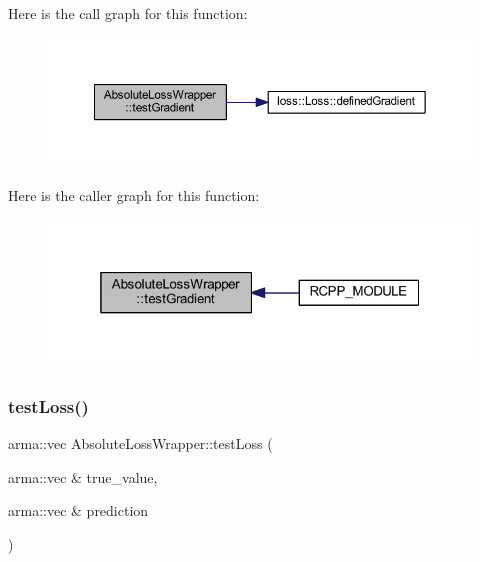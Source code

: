 Here is the call graph for this function\+:\nopagebreak
\begin{figure}[H]
\begin{center}
\leavevmode
\includegraphics[width=350pt]{class_absolute_loss_wrapper_af64fe7b1882afacfc7cc408a79884861_cgraph}
\end{center}
\end{figure}
Here is the caller graph for this function\+:\nopagebreak
\begin{figure}[H]
\begin{center}
\leavevmode
\includegraphics[width=319pt]{class_absolute_loss_wrapper_af64fe7b1882afacfc7cc408a79884861_icgraph}
\end{center}
\end{figure}
\mbox{\label{class_absolute_loss_wrapper_a85a76340b719fa2af7cc9964c7e668ed}} 
\subsubsection{\texorpdfstring{test\+Loss()}{testLoss()}}
{\footnotesize\ttfamily arma\+::vec Absolute\+Loss\+Wrapper\+::test\+Loss (\begin{DoxyParamCaption}\item[{arma\+::vec \&}]{true\+\_\+value,  }\item[{arma\+::vec \&}]{prediction }\end{DoxyParamCaption})\hspace{0.3cm}{\ttfamily [inline]}}


